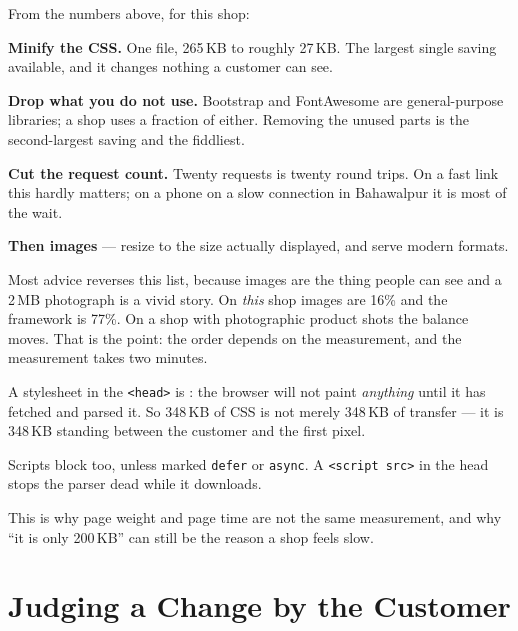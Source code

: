 \begin{conceptbox}
From the numbers above, for this shop:

\begin{tightnum}
  \item \textbf{Minify the CSS.} One file, 265\,KB to roughly 27\,KB. The
        largest single saving available, and it changes nothing a customer can
        see.
  \item \textbf{Drop what you do not use.} Bootstrap and FontAwesome are
        general-purpose libraries; a shop uses a fraction of either. Removing
        the unused parts is the second-largest saving and the fiddliest.
  \item \textbf{Cut the request count.} Twenty requests is twenty round trips.
        On a fast link this hardly matters; on a phone on a slow connection in
        Bahawalpur it is most of the wait.
  \item \textbf{Then images} --- resize to the size actually displayed, and
        serve modern formats.
\end{tightnum}

\smallskip
Most advice reverses this list, because images are the thing people can see and
a 2\,MB photograph is a vivid story. On \emph{this} shop images are 16\% and
the framework is 77\%. On a shop with photographic product shots the balance
moves. That is the point: the order depends on the measurement, and the
measurement takes two minutes.
\end{conceptbox}

\begin{alertbox}
A stylesheet in the \texttt{<head>} is : the browser will
not paint \emph{anything} until it has fetched and parsed it. So 348\,KB of CSS
is not merely 348\,KB of transfer --- it is 348\,KB standing between the
customer and the first pixel.

\smallskip
Scripts block too, unless marked \texttt{defer} or \texttt{async}. A
\texttt{<script src>} in the head stops the parser dead while it downloads.

\smallskip
This is why page weight and page time are not the same measurement, and why
``it is only 200\,KB'' can still be the reason a shop feels slow.
\end{alertbox}

\section{Judging a Change by the Customer}

